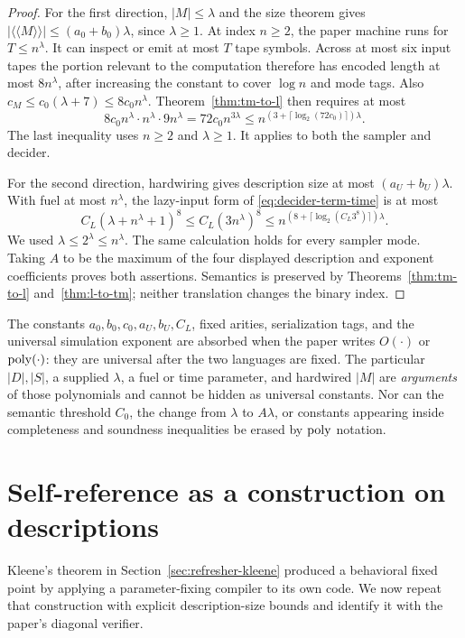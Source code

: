 \begin{proof}
For the first direction, \(|M|\leq\lambda\) and the size theorem gives
\(|\langle\!\langle M\rangle\!\rangle|\leq(a_0+b_0)\lambda\), since \(\lambda\geq1\).
At index \(n\geq2\), the paper machine runs for \(T\leq n^\lambda\).  It can
inspect or emit at most \(T\) tape symbols.  Across at most six input tapes the
portion relevant to the computation therefore has encoded length at most
\(8n^\lambda\), after increasing the constant to cover \(\log n\) and mode
tags.  Also
\(c_M\leq c_0(\lambda+7)\leq8c_0n^\lambda\).  Theorem~\ref{thm:tm-to-l}
then requires at most
\[
 8c_0n^\lambda\cdot n^\lambda\cdot9n^\lambda
 =72c_0n^{3\lambda}
 \leq n^{(3+\lceil\log_2(72c_0)\rceil)\lambda}.
\]
The last inequality uses \(n\geq2\) and \(\lambda\geq1\).  It applies to
both the sampler and decider.

For the second direction, hardwiring gives description size at most
\((a_U+b_U)\lambda\).  With fuel at most \(n^\lambda\), the lazy-input form of
\eqref{eq:decider-term-time} is at most
\[
 C_L(\lambda+n^\lambda+1)^8
 \leq C_L(3n^\lambda)^8
 \leq n^{(8+\lceil\log_2(C_L3^8)\rceil)\lambda}.
\]
We used \(\lambda\leq2^\lambda\leq n^\lambda\).  The same calculation holds
for every sampler mode.  Taking \(A\) to be the maximum of the four displayed
description and exponent coefficients proves both assertions.  Semantics is
preserved by Theorems~\ref{thm:tm-to-l} and~\ref{thm:l-to-tm}; neither
translation changes the binary index.
\end{proof}


The constants \(a_0,b_0,c_0,a_U,b_U,C_L\), fixed arities, serialization tags,
and the universal simulation exponent are absorbed when the paper writes
\(O(\cdot)\) or \(\operatorname{poly}(\cdot)\): they are universal after the two languages
are fixed.  The particular \(|D|,|S|\), a supplied \(\lambda\), a fuel or time
parameter, and hardwired \(|M|\) are \emph{arguments} of those polynomials and
cannot be hidden as universal constants.  Nor can the semantic threshold
\(C_0\), the change from \(\lambda\) to \(A\lambda\), or constants appearing
inside completeness and soundness inequalities be erased by \(\operatorname{poly}\)
notation.

\section{Self-reference as a construction on descriptions}
\label{sec:self-reference}

\begin{reminder}
Kleene's theorem in Section~\ref{sec:refresher-kleene} produced a behavioral
fixed point by applying a parameter-fixing compiler to its own code.  We now
repeat that construction with explicit description-size bounds and identify
it with the paper's diagonal verifier.
\end{reminder}

